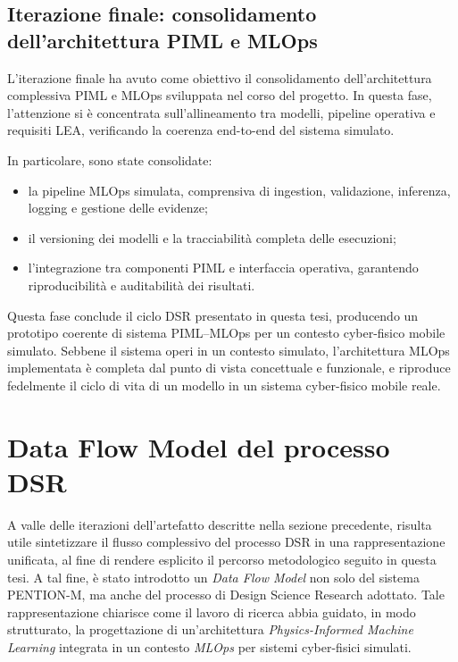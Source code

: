 \subsection{Iterazione finale: consolidamento dell’architettura PIML e MLOps}
\label{subsec:iter_final}

L’iterazione finale ha avuto come obiettivo il consolidamento dell’architettura complessiva PIML e MLOps sviluppata nel corso del progetto.
In questa fase, l’attenzione si è concentrata sull’allineamento tra modelli, pipeline operativa e requisiti LEA, verificando la coerenza end-to-end del sistema simulato.

In particolare, sono state consolidate:
\begin{itemize}
    \item la pipeline MLOps simulata, comprensiva di ingestion, validazione, inferenza, logging e gestione delle evidenze;
    \item il versioning dei modelli e la tracciabilità completa delle esecuzioni;
    \item l’integrazione tra componenti PIML e interfaccia operativa, garantendo riproducibilità e auditabilità dei risultati.
\end{itemize}

Questa fase conclude il ciclo DSR presentato in questa tesi, producendo un prototipo coerente di sistema PIML–MLOps per un contesto cyber-fisico mobile simulato.
Sebbene il sistema operi in un contesto simulato, l’architettura MLOps implementata è completa dal punto di vista concettuale e funzionale, e riproduce fedelmente il ciclo di vita di un modello in un sistema cyber-fisico mobile reale.

\section{Data Flow Model del processo DSR}
\label{sec:dsr_dataflow}

A valle delle iterazioni dell’artefatto descritte nella sezione precedente, risulta utile sintetizzare il flusso complessivo del processo DSR in una rappresentazione unificata, al fine di rendere esplicito il percorso metodologico seguito in questa tesi.
A tal fine, è stato introdotto un \emph{Data Flow Model} non solo del sistema PENTION-M, ma anche del processo di Design Science Research adottato.
Tale rappresentazione chiarisce come il lavoro di ricerca abbia guidato, in modo strutturato, la progettazione di un’architettura \emph{Physics-Informed Machine Learning} integrata in un contesto \emph{MLOps} per sistemi cyber-fisici simulati.

